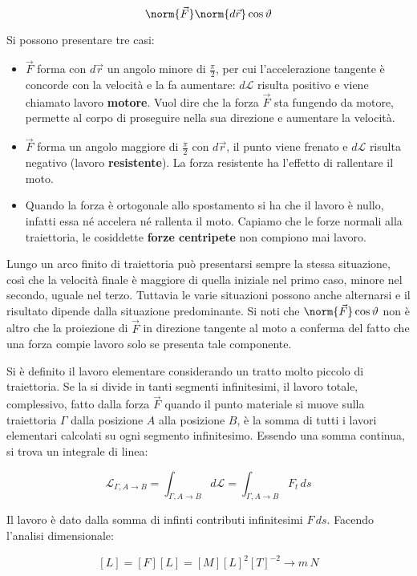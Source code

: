 \[
	\norm{\vec{F}}\norm{d\vec{r}}\cos\vartheta
\]

Si possono presentare tre casi:

\begin{itemize}
	\item $\vec{F}$ forma con $d\vec{r}$ un angolo minore di $\frac{\pi}{2}$, per cui l'accelerazione tangente è concorde con la velocità e la fa aumentare: $d\mathcal{L}$ risulta positivo e viene chiamato lavoro \textbf{motore}. Vuol dire che la forza $\vec{F}$ sta fungendo da motore, permette al corpo di proseguire nella sua direzione e aumentare la velocità.
	\item $\vec{F}$ forma un angolo maggiore di $\frac{\pi}{2}$ con $d\vec{r}$, il punto viene frenato e $d\mathcal{L}$ risulta negativo (lavoro \textbf{resistente}). La forza resistente ha l'effetto di rallentare il moto.
	\item Quando la forza è ortogonale allo spostamento si ha che il lavoro è nullo, infatti essa né accelera né rallenta il moto. Capiamo che le forze normali alla traiettoria, le cosiddette \textbf{forze centripete} non compiono mai lavoro.
\end{itemize}

Lungo un arco finito di traiettoria può presentarsi sempre la stessa situazione, così che la velocità finale è maggiore di quella iniziale nel primo caso, minore nel secondo, uguale nel terzo. Tuttavia le varie situazioni possono anche alternarsi e il risultato dipende dalla situazione predominante.
Si noti che $\norm{\vec{F}} \cos\vartheta$ non è altro che la proiezione di $\vec{F}$ in direzione tangente al moto a conferma del fatto che una forza compie lavoro solo se presenta tale componente.

Si è definito il lavoro elementare considerando un tratto molto piccolo di traiettoria. Se la si divide in tanti segmenti infinitesimi, il lavoro totale, complessivo, fatto dalla forza $\vec{F}$ quando il punto materiale si muove sulla traiettoria $\Gamma$ dalla posizione $A$ alla posizione $B$, è la somma di tutti i lavori elementari calcolati su ogni segmento infinitesimo. Essendo una somma continua, si trova un integrale di linea:

\[
	\boxed{\mathcal{L}_{\Gamma, A\to B}=\int_{\Gamma, A\to B} d\mathcal{L}=\int_{\Gamma, A\to B} F_t\,ds}
\]

Il lavoro è dato dalla somma di infinti contributi infinitesimi $F\,ds$.
Facendo l'analisi dimensionale:

\[
	[L]=[F][L]=[M][L]^2[T]^{-2} \to m\,N
\]


